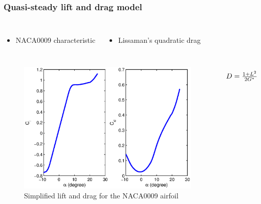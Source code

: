 \documentclass[compress]{beamer}
\begin{document}
\begin{frame}
  \frametitle{Quasi-steady lift and drag model}
  \begin{columns}[t]
    \begin{itemize}
      \item NACA0009 characteristic
    \end{itemize}
    \begin{itemize}
      \item Lissaman's quadratic drag
    \end{itemize}
  \end{columns}
  \begin{columns}
	\begin{figure}[h]
	  \centering
	  \includegraphics[width=1\textwidth]{./Figures/NACA0009_steady_map_Cl_Cd.eps}
	  \caption{Simplified lift and drag for the NACA0009 airfoil}
	\end{figure}
	\begin{equation*}
    \begin{array}[c]{c}
	  D=\frac{1+L^2}{2G^*}\\ \\ \\ \\ 
	\end{array}
	\end{equation*}
  \end{columns}
\end{frame}
\end{document}
